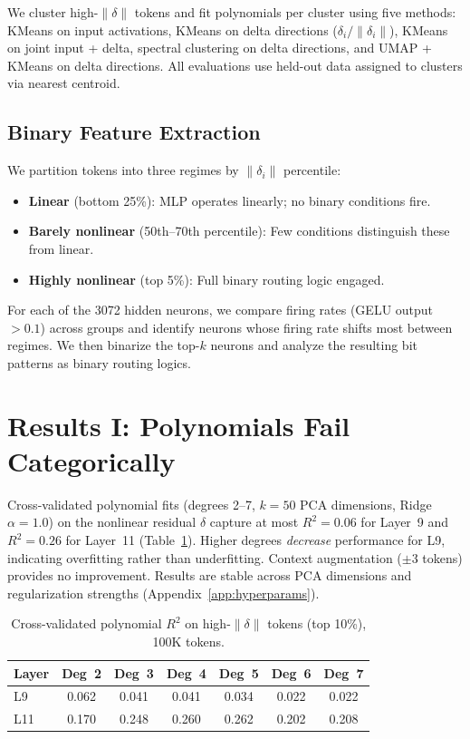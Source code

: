 \documentclass{article}
\begin{document}
We cluster high-$\|\delta\|$ tokens and fit polynomials per cluster using five methods:
KMeans on input activations, KMeans on delta directions ($\delta_i / \|\delta_i\|$), KMeans
on joint input + delta, spectral clustering on delta directions, and UMAP + KMeans on delta
directions. All evaluations use held-out data assigned to clusters via nearest centroid.

\subsection{Binary Feature Extraction}

We partition tokens into three regimes by $\|\delta_i\|$ percentile:

\begin{itemize}[leftmargin=*]
\item \textbf{Linear} (bottom 25\%): MLP operates linearly; no binary conditions fire.
\item \textbf{Barely nonlinear} (50th--70th percentile): Few conditions distinguish these from linear.
\item \textbf{Highly nonlinear} (top 5\%): Full binary routing logic engaged.
\end{itemize}

For each of the 3072 hidden neurons, we compare firing rates (GELU output $> 0.1$) across groups
and identify neurons whose firing rate shifts most between regimes. We then binarize the top-$k$
neurons and analyze the resulting bit patterns as binary routing logics.

\section{Results I: Polynomials Fail Categorically}
\label{sec:poly}

Cross-validated polynomial fits (degrees 2--7, $k=50$ PCA dimensions, Ridge $\alpha=1.0$)
on the nonlinear residual $\delta$ capture at most $R^2 = 0.06$ for Layer~9 and $R^2 = 0.26$
for Layer~11 (Table~\ref{tab:polyr2}). Higher degrees \emph{decrease} performance for L9,
indicating overfitting rather than underfitting. Context augmentation ($\pm$3 tokens) provides
no improvement. Results are stable across PCA dimensions and regularization strengths
(Appendix~\ref{app:hyperparams}).

\begin{table}[t]
\caption{Cross-validated polynomial $R^2$ on high-$\|\delta\|$ tokens (top 10\%), 100K tokens.}
\label{tab:polyr2}
\centering
\begin{tabular}{lcccccc}
\toprule
Layer & Deg~2 & Deg~3 & Deg~4 & Deg~5 & Deg~6 & Deg~7 \\
\midrule
L9  & 0.062 & 0.041 & 0.041 & 0.034 & 0.022 & 0.022 \\
L11 & 0.170 & 0.248 & 0.260 & 0.262 & 0.202 & 0.208 \\
\bottomrule
\end{tabular}
\end{table}
\end{document}
